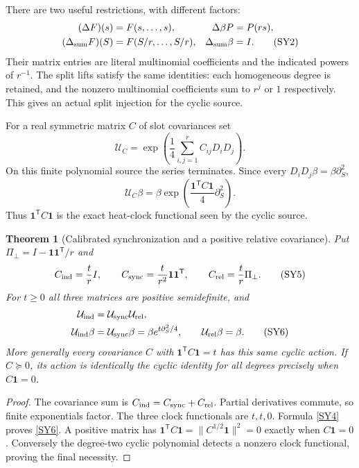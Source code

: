 \documentclass[11pt,a4paper]{article}
\newtheorem{theorem}{Theorem}[section]
\theoremstyle{definition}\newtheorem{definition}[theorem]{Definition}
\newcommand{\ve}{\mathbf 1}\newcommand{\sh}{\sharp}
\begin{document}
There are two useful restrictions, with different factors:
\begin{align}
 (\Delta F)(s)&=F(s,\ldots,s),&\Delta\beta P&=P(rs),\notag\\
 (\Delta_{\rm sum}F)(S)&=F(S/r,\ldots,S/r),&
 \Delta_{\rm sum}\beta&=I.                                    \tag{SY2}\label{SY2}
\end{align}
Their matrix entries are literal multinomial coefficients and the indicated powers of $r^{-1}$. The split lifts satisfy the same identities: each homogeneous degree is retained, and the nonzero multinomial coefficients sum to $r^j$ or $1$ respectively. This gives an actual split injection for the cyclic source.

For a real symmetric matrix $C$ of slot covariances set
\begin{equation}
 \mathcal U_C=\exp\left(\frac14\sum_{i,j=1}^r C_{ij}D_iD_j\right).
                                                               \tag{SY3}\label{SY3}
\end{equation}
On this finite polynomial source the series terminates. Since every $D_iD_j\beta=\beta\partial_S^2$,
\begin{equation}
 \boxed{\mathcal U_C\beta
 =\beta\exp\left(\frac{\ve^{\mathsf T}C\ve}{4}\partial_S^2\right).}
                                                               \tag{SY4}\label{SY4}
\end{equation}
Thus $\ve^{\mathsf T}C\ve$ is the exact heat-clock functional seen by the cyclic source.

\begin{theorem}[Calibrated synchronization and a positive relative covariance]
Put $\Pi_\perp=I-\ve\ve^{\mathsf T}/r$ and
\begin{equation}
 C_{\rm ind}=\frac trI,\qquad
 C_{\rm sync}=\frac t{r^2}\ve\ve^{\mathsf T},\qquad
 C_{\rm rel}=\frac tr\Pi_\perp.                                \tag{SY5}\label{SY5}
\end{equation}
For $t\ge0$ all three matrices are positive semidefinite, and
\begin{align}
 \mathcal U_{\rm ind}&=\mathcal U_{\rm sync}\mathcal U_{\rm rel},\notag\\
 \mathcal U_{\rm ind}\beta&=\mathcal U_{\rm sync}\beta
     =\beta e^{t\partial_S^2/4},\qquad
 \mathcal U_{\rm rel}\beta=\beta.                             \tag{SY6}\label{SY6}
\end{align}
More generally every covariance $C$ with $\ve^{\mathsf T}C\ve=t$ has this same cyclic action. If $C\succeq0$, its action is identically the cyclic identity for all degrees precisely when $C\ve=0$.
\end{theorem}
\begin{proof}
The covariance sum is $C_{\rm ind}=C_{\rm sync}+C_{\rm rel}$. Partial derivatives commute, so finite exponentials factor. The three clock functionals are $t,t,0$. Formula \eqref{SY4} proves \eqref{SY6}. A positive matrix has $\ve^{\mathsf T}C\ve=\|C^{1/2}\ve\|^2=0$ exactly when $C\ve=0$. Conversely the degree-two cyclic polynomial detects a nonzero clock functional, proving the final necessity.
\end{proof}
\end{document}
